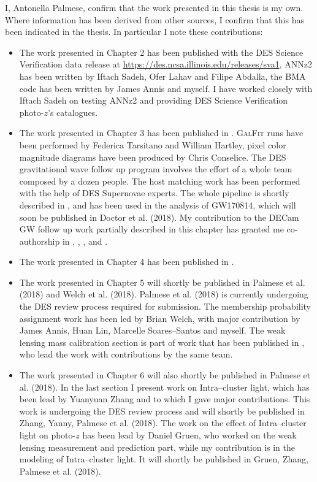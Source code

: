 \thispagestyle{empty}

\vspace*{3cm}

\begin{flushleft}
I, Antonella Palmese, confirm that the work presented in this thesis is my own. Where
information has been derived from other sources, I confirm that this has been indicated in
the thesis. In particular I note these contributions:
\begin{itemize}
\item The work presented in Chapter 2 has been published with the DES Science Verification data release at \url{https://des.ncsa.illinois.edu/releases/sva1}, ANNz2 has been written by Iftach Sadeh, Ofer Lahav and Filipe Abdalla, the BMA code has been written by James Annis and myself. I have worked closely with Iftach Sadeh on testing ANNz2 and providing DES Science Verification photo-$z$'s catalogues.
\item The work presented in Chapter 3 has been published in \citet{palmese17}. \textsc{GalFit} runs have been performed by Federica Tarsitano and William Hartley, pixel color magnitude diagrams have been produced by Chris Conselice. The DES gravitational wave follow up program involves the effort of a whole team composed by a dozen people. The host matching work has been performed with the help of DES Supernovae experts. The whole pipeline is shortly described in \citet{herner}, and has been used in the analysis of GW170814, which will soon be published in Doctor et al. (2018). My contribution to the DECam GW follow up work partially described in this chapter has granted me co-authorship in \citet{MMApaper}, \citet{gw170817h0}, \citet{marcelle17}, \citet{scolnic} and \citet{Cowperthwaite}.
\item The work presented in Chapter 4 has been published in \citet{palmese16}.
\item The work presented in Chapter 5 will shortly be published in Palmese et al. (2018) and Welch et al. (2018). Palmese et al. (2018) is currently undergoing the DES review process required for submission. The membership probability assignment work has been led by Brian Welch, with major contribution by James Annis, Huan Lin, Marcelle Soares--Santos and myself. The weak lensing mass calibration section is part of work that has been published in \citet{maria}, who lead the work with contributions by the same team.
\item The work presented in Chapter 6 will also shortly be published in Palmese et al. (2018). In the last section I present work on Intra--cluster light, which has been lead by Yuanyuan Zhang and to which I gave major contributions. This work is undergoing the DES review process and will shortly be published in Zhang, Yanny, Palmese et al. (2018). The work on the effect of Intra--cluster light on photo-$z$ has been lead by Daniel Gruen, who worked on the weak lensing measurement and prediction part, while my contribution is in the modeling of Intra--cluster light. It will shortly be published in Gruen, Zhang, Palmese et al. (2018).
\end{itemize}
\end{flushleft}